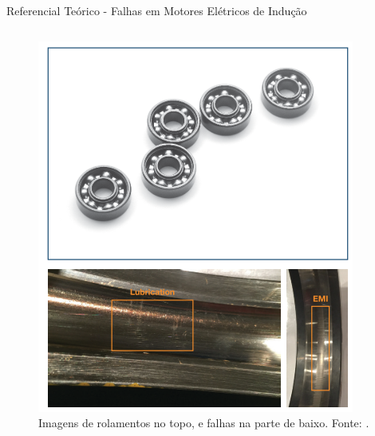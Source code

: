 \documentclass[aspectratio=169]{beamer}
\begin{document}
\begin{frame}{Referencial Teórico - Falhas em Motores Elétricos de Indução}
\begin{columns}
		\begin{column}{0.5\textwidth}
			\begin{figure}[HT]
				\begin{center}
					\captionsetup{justification=justified}
					\includegraphics[scale=.3]{../referencial/img/bearing_analog_p3.png}
					\caption{Imagens de rolamentos no \newline
					topo, e falhas na parte de baixo. \newline
					Fonte: .} 
					\label{fig:faults_rilski_p77}
				\end{center}
			\end{figure}
	 	\end{column}
	 \end{columns}
\end{frame}

\end{document}
